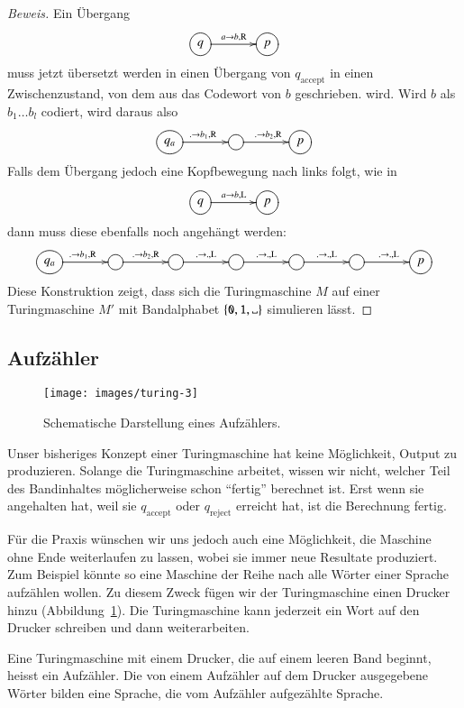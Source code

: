 \begin{proof}[Beweis]
Ein Übergang
\[
\entrymodifiers={++[o][F]}
\xymatrix@C+1pc{
q\ar[r]^{a\to b,\text{R}}
	&p
}
\]
muss jetzt übersetzt werden in einen Übergang von $q_\text{accept}$ in einen
Zwischenzustand, von dem aus das Codewort von $b$ geschrieben.
wird. Wird $b$ als $b_1\dots b_l$ codiert, wird daraus also
\[
\entrymodifiers={++[o][F]}
\xymatrix@C+1pc{
q_a\ar[r]^{.\to b_1,\text{R}}
	&\ar[r]^{.\to b_2,\text{R}}
		&p
}
\]
Falls dem Übergang jedoch eine Kopfbewegung nach links folgt, wie in
\[
\entrymodifiers={++[o][F]}
\xymatrix@C+1pc{
q\ar[r]^{a\to b,\text{L}}
	&p
}
\]
dann muss diese ebenfalls noch angehängt werden:
\[
\entrymodifiers={++[o][F]}
\xymatrix@C+1pc{
q_a\ar[r]^{.\to b_1,\text{R}}
	&\ar[r]^{.\to b_2,\text{R}}
		&\ar[r]^{.\to .,\text{L}}
			&\ar[r]^{.\to .,\text{L}}
				&\ar[r]^{.\to .,\text{L}}
					&\ar[r]^{.\to .,\text{L}}
						&p
}
\]
Diese Konstruktion zeigt, dass sich die Turingmaschine $M$ auf einer
Turingmaschine $M'$ mit Bandalphabet $\{\texttt{0},\texttt{1},\blank\}$ simulieren
lässt.
\end{proof}

\subsection{Aufzähler}
\begin{figure}
\begin{center}
\texttt{[image: images/turing-3]}
\end{center}
\caption{Schematische Darstellung eines Aufzählers.\label{turing-aufzaehler}}
\end{figure}
Unser bisheriges Konzept einer Turingmaschine hat keine Möglichkeit,
Output zu produzieren. Solange die Turingmaschine arbeitet, wissen wir
nicht, welcher Teil des Bandinhaltes möglicherweise schon ``fertig''
berechnet ist. Erst wenn sie angehalten hat, weil sie $q_{\text{accept}}$
oder $q_{\text{reject}}$ erreicht hat, ist die Berechnung fertig.

Für die Praxis wünschen wir uns jedoch auch eine Möglichkeit,
die Maschine ohne Ende weiterlaufen zu lassen, wobei sie immer neue
Resultate produziert. Zum Beispiel könnte so eine Maschine der Reihe
nach alle Wörter einer Sprache aufzählen wollen. Zu diesem Zweck
fügen wir der Turingmaschine einen Drucker hinzu
(Abbildung~\ref{turing-aufzaehler}). Die Turingmaschine
kann jederzeit ein Wort auf den Drucker schreiben und dann
weiterarbeiten.

\begin{definition}
Eine Turingmaschine mit einem Drucker, die auf einem leeren Band beginnt,
heisst ein Aufzähler. Die von einem Aufzähler auf dem Drucker ausgegebene
Wörter bilden eine Sprache, die vom Aufzähler aufgezählte Sprache.
\end{definition}

